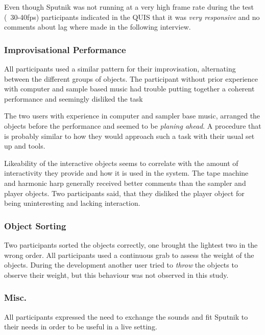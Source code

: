 \documentclass[10pt,a4paper]{scrartcl}
\begin{document}
Even though Sputnik was not running at a very high frame rate during the test (~30-40fps) participants indicated in the QUIS that it was \emph{very responsive} and no comments about lag where made in the following interview.




\subsubsection{Improvisational Performance}
All participants used a similar pattern for their improvisation, alternating between the different groups of objects. The participant without prior experience with computer and sample based music had trouble putting together a coherent performance and seemingly disliked the task

The two users with experience in computer and sampler base music, arranged the objects before the performance and seemed to be \emph{planing ahead}. A procedure that is probably similar to how they would approach such a task with their usual set up and tools.

Likeability of the interactive objects seems to correlate with the amount of interactivity they provide and how it is used in the system. The tape machine and harmonic harp generally received better comments than the sampler and player objects. Two participants said, that they disliked the player object for being uninteresting and lacking interaction.


\subsubsection{Object Sorting}
Two participants sorted the objects correctly, one brought the lightest two in the wrong order. All participants used a continuous grab to assess the weight of the objects. During the development another user tried to \emph{throw} the objects to observe their weight, but this behaviour was not observed in this study.

\subsubsection{Misc.}
All participants expressed the need to exchange the sounds and fit Sputnik to their needs in order to be useful in a live setting.
\end{document}
